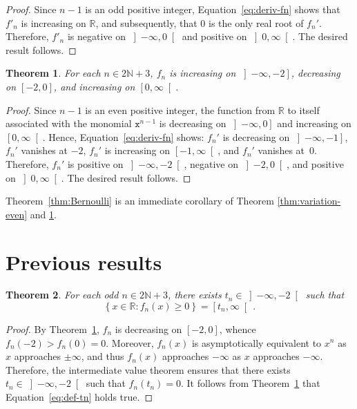 \documentclass[12pt]{article}
\newcommand{\bR}{\mathbb{R}}
\newcommand{\bN}{\mathbb{N}}
\newcommand{\gtint}[1]{\left] #1, \infty \right[}
\newcommand{\geint}[1]{\left[ #1, \infty \right[}
\newcommand{\ltint}[1]{\left]- \infty, #1 \right[}
\newcommand{\leint}[1]{\left]- \infty, #1 \right]}
\newcommand{\ttx}{\mathtt{x}}
\newtheorem{theorem}{Theorem}
\begin{document}
 \begin{proof}
   Since $n - 1$ is an odd positive integer,
   Equation~\eqref{eq:deriv-fn} shows that
   $f'_n$ is increasing on $\bR$,
   and subsequently, that
   $0$ is the only real root of $f_n'$.
   Therefore,
   $f'_n$ is negative on $\ltint{0}$
   and 
   positive on $\gtint{0}$.
   The desired result follows.
 \end{proof}


 \begin{theorem} \label{thm:variation-odd}
   For each $n \in 2 \bN + 3$, $f_n$ is
   increasing on $\leint{- 2}$,
   decreasing on $[- 2, 0]$, and
   increasing on $\geint{0}$.
 \end{theorem}

 \begin{proof}
   Since $n - 1$ is an even positive integer,
   the function from $\bR$ to itself associated with the monomial $\ttx^{n - 1}$ is
   decreasing on $\leint{0}$ and
   increasing on $\geint{0}$.
   Hence, 
   Equation~\eqref{eq:deriv-fn} shows: 
   $f_n'$ is decreasing on $\leint{- 1}$,
   $f_n'$ vanishes at $- 2$,
   $f_n'$ is increasing on $\geint{- 1}$, and
   $f_n'$ vanishes at~$0$.
   Therefore, $f_n'$ is positive on $\ltint{- 2}$,
   negative on $\left]- 2, 0 \right[$, and
   positive on $\gtint{0}$.
   The desired result follows.
 \end{proof}
 
 Theorem~\ref{thm:Bernoulli} is an immediate corollary of Theorem \ref{thm:variation-even} and \ref{thm:variation-odd}.
 

 \section{Previous results} 
 
 \begin{theorem} \label{thm:tipping-point}
   For each odd  $n \in 2 \bN + 3$,
   there exists $t_n \in \ltint{- 2}$ such that
 \begin{equation} \label{eq:def-tn}
 \left\{ x \in \bR : f_n(x) \ge 0 \right\}
 =
 \geint{t_n} \,. 
 \end{equation} 
 \end{theorem} 

 \begin{proof}
   By Theorem~\ref{thm:variation-odd},  $f_n$ is decreasing on $[- 2, 0]$,
   whence   $f_n(- 2) > f_n(0) = 0$.
   Moreover, $f_n(x)$ is asymptotically equivalent to $x^n$ as $x$ approaches $\pm \infty$,
   and thus $f_n(x)$ approaches $- \infty$ as $x$ approaches $- \infty$.
   Therefore, the intermediate value theorem ensures that there exists $t_n \in \ltint{- 2}$ such that $f_n(t_n) = 0$.
   It follows from Theorem~\ref{thm:variation-odd} that Equation~\eqref{eq:def-tn} holds true.
 \end{proof}
\end{document}
